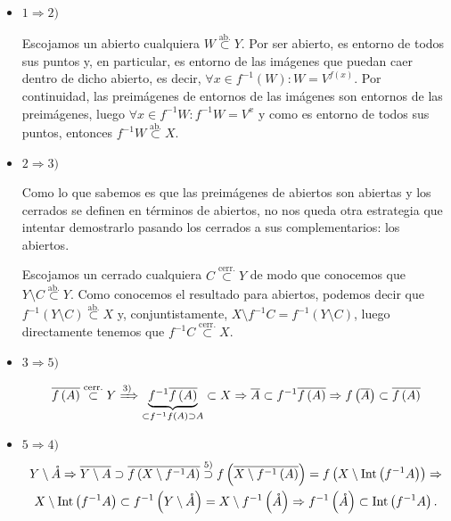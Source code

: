 \begin{demo}
\begin{itemize}
    \item $1 \Rightarrow 2)$
    
    Escojamos un abierto cualquiera $W \stackrel{\text{ab.}}{\subset} Y$. Por ser abierto, es entorno de todos sus puntos y, en particular, es entorno de las imágenes que puedan caer dentro de dicho abierto, es decir, $\forall x \in f^{-1} (W) : W = V^{f(x)}$. Por continuidad, las preimágenes de entornos de las imágenes son entornos de las preimágenes, luego $\forall x \in f^{-1} W : f^{-1}W = V^x$ y como es entorno de todos sus puntos, entonces $f^{-1} W \stackrel{\text{ab.}}{\subset} X$.
    \item $2 \Rightarrow 3)$
    
    Como lo que sabemos es que las preimágenes de abiertos son abiertas y los cerrados se definen en términos de abiertos, no nos queda otra estrategia que intentar demostrarlo pasando los cerrados a sus complementarios: los abiertos.
    
    Escojamos un cerrado cualquiera $C \stackrel{\text{cerr.}}{\subset} Y$ de modo que conocemos que $Y \setminus C \stackrel{\text{ab.}}{\subset} Y$. Como conocemos el resultado para abiertos, podemos decir que $f^{-1}\left( Y\setminus C \right) \stackrel{\text{ab.}}{\subset} X$ y, conjuntistamente, $X \setminus f^{-1}C = f^{-1}\left( Y\setminus C \right)$, luego directamente tenemos que $f^{-1}C \stackrel{\text{cerr.}}{\subset} X$. 
    \item $3 \Rightarrow 5)$

    \[
        \overline{f\left( A \right)} \stackrel{\text{cerr.}}{\subset} Y \xRightarrow{3)} \underbrace{f^{-1}\overline{f\left( A \right)}}_{\subset f^{-1}f\left( A \right) \supset A} \subset X \Rightarrow \overline{A} \subset f^{-1}\overline{f\left( A \right)} \Rightarrow f\left( \overline{A} \right) \subset \overline{f\left( A \right)} 
    \]
    \item $5 \Rightarrow 4)$
    \begin{gather*}
        Y \setminus \mathring{A}\Rightarrow \overline{Y\setminus A} \supset \overline{f\left( X \setminus f^{-1}A \right)} \stackrel{5)}{\supset} f\left( \overline{X \setminus f^{-1}\left( A \right)} \right) = f\left( X \setminus \operatorname{Int}\left( f^{-1}A \right) \right) \Rightarrow\\
        X \setminus \operatorname{Int}\left( f^{-1}A \right) \subset f^{-1}\left( Y\setminus \mathring{A} \right) = X \setminus f^{-1}\left( \mathring{A} \right)\Rightarrow f^{-1}\left( \mathring{A} \right) \subset \operatorname{Int}\left( f^{-1}A \right) 
    .\end{gather*}


\end{itemize}
\end{demo}
